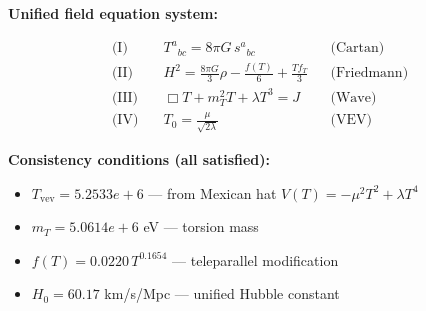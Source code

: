 
\textbf{Unified field equation system:}

\begin{align}
  \text{(I)} \quad & T^a{}_{bc} = 8\pi G \, s^a{}_{bc} && \text{(Cartan)} \\
  \text{(II)} \quad & H^2 = \frac{8\pi G}{3}\rho - \frac{f(T)}{6} + \frac{Tf_T}{3} && \text{(Friedmann)} \\
  \text{(III)} \quad & \Box T + m_T^2 T + \lambda T^3 = J && \text{(Wave)} \\
  \text{(IV)} \quad & T_0 = \frac{\mu}{\sqrt{2\lambda}} && \text{(VEV)}
\end{align}

\textbf{Consistency conditions (all satisfied):}
\begin{itemize}
  \item $T_{\text{vev}} = 5.2533e+6$ — from Mexican hat $V(T) = -\mu^2 T^2 + \lambda T^4$
  \item $m_T = 5.0614e+6$ eV — torsion mass
  \item $f(T) = 0.0220 \, T^{0.1654}$ — teleparallel modification
  \item $H_0 = 60.17$ km/s/Mpc — unified Hubble constant
\end{itemize}